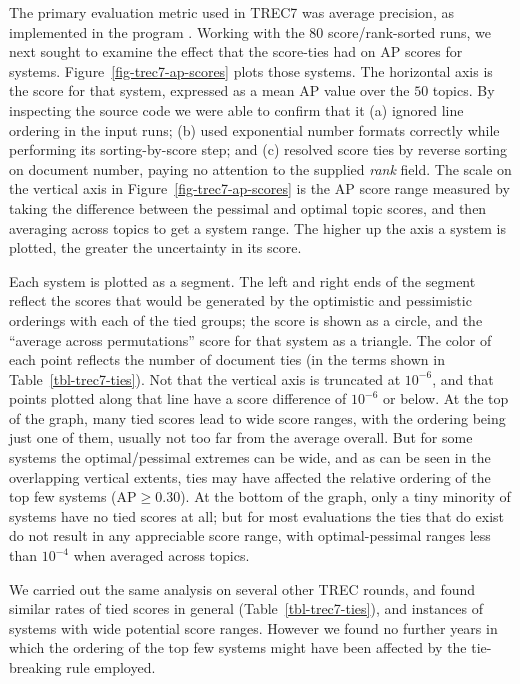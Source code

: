 The primary evaluation metric used in TREC7 was average precision, as
implemented in the program {\treceval}.
Working with the $80$ score/rank-sorted runs, we next sought to
examine the effect that the score-ties had on AP scores for systems.
Figure~\ref{fig-trec7-ap-scores} plots those systems.
The horizontal axis is the {\treceval} score for that system,
expressed as a mean AP value over the $50$ topics.
By inspecting the {\treceval} source code we were able to confirm
that it (a) ignored line ordering in the input runs; (b) used
exponential number formats correctly while performing its
sorting-by-score step; and (c) resolved score ties by reverse sorting
on document number, paying no attention to the supplied {\emph{rank}}
field.
The scale on the vertical axis in Figure~\ref{fig-trec7-ap-scores} is
the AP score range measured by taking the difference between the
pessimal and optimal topic scores, and then averaging across topics
to get a system range.
The higher up the axis a system is plotted, the greater the
uncertainty in its score.

Each system is plotted as a segment.
The left and right ends of the segment reflect the scores that would
be generated by the optimistic and pessimistic orderings with each of
the tied groups; the {\treceval} score is shown as a circle, and the
``average across permutations'' score for that system as a triangle.
The color of each point reflects the number of document ties (in the
terms shown in Table~\ref{tbl-trec7-ties}).
Not that the vertical axis is truncated at $10^{-6}$, and that points
plotted along that line have a score difference of $10^{-6}$ or
below.
At the top of the graph, many tied scores lead to wide score ranges,
with the {\treceval} ordering being just one of them, usually not too
far from the average overall.
But for some systems the optimal/pessimal extremes can be wide, and
as can be seen in the overlapping vertical extents, ties may have
affected the relative ordering of the top few systems ($\mbox{AP}\ge
0.30$).
At the bottom of the graph, only a tiny minority of systems have no
tied scores at all; but for most evaluations the ties that do exist
do not result in any appreciable score range, with optimal-pessimal
ranges less than $10^{-4}$ when averaged across topics.



We carried out the same analysis on several other TREC rounds, and
found similar rates of tied scores in general
(Table~\ref{tbl-trec7-ties}), and instances of systems with wide
potential score ranges.
However we found no further years in which the ordering of the
top few systems might have been affected by the tie-breaking rule
employed.


